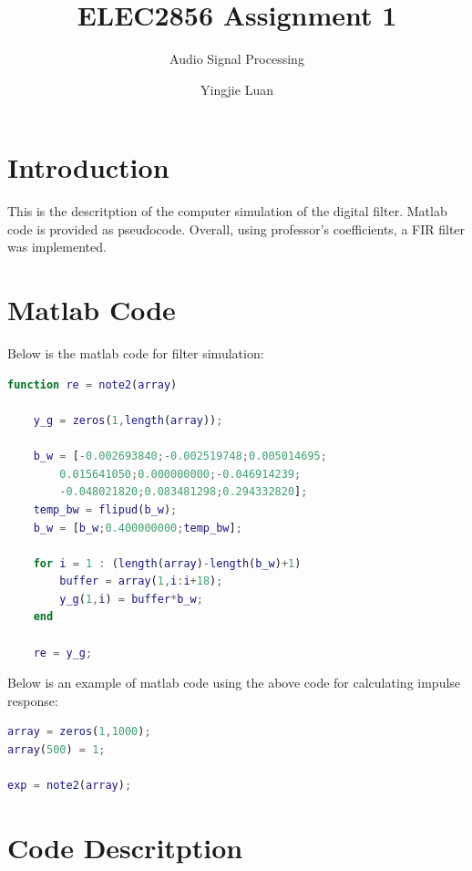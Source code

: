 \documentclass[11pt]{scrartcl}
\begin{document}
\title{ELEC2856 Assignment 1}
\subtitle{ Audio Signal Processing}
\author{Yingjie Luan}
\maketitle

\tableofcontents

\section{Introduction} %
\label{sec:introduction}

This is the descritption of the computer simulation of the digital filter. Matlab code is provided as pseudocode. Overall, using professor's coefficients, a FIR filter was implemented.  



\section{Matlab Code} %
\label{sec:matlab_code}

Below is the matlab code for filter simulation:
\begin{lstlisting}[language=Matlab]
function re = note2(array)
    
    y_g = zeros(1,length(array));
    
    b_w = [-0.002693840;-0.002519748;0.005014695;
        0.015641050;0.000000000;-0.046914239;
        -0.048021820;0.083481298;0.294332820];
    temp_bw = flipud(b_w);
    b_w = [b_w;0.400000000;temp_bw];
    
    for i = 1 : (length(array)-length(b_w)+1)
        buffer = array(1,i:i+18);
        y_g(1,i) = buffer*b_w;      
    end
    
    re = y_g;
\end{lstlisting}

Below is an example of matlab code using the above code for calculating impulse response:
\begin{lstlisting}[language=Matlab]
array = zeros(1,1000);
array(500) = 1;

exp = note2(array);
\end{lstlisting}


\section{Code Descritption} %
\label{sec:code_descritption}
\end{document}
